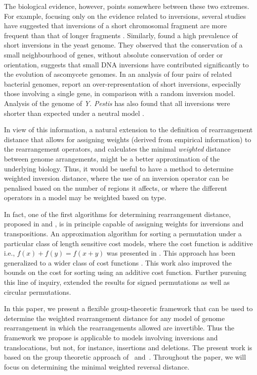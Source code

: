 \documentclass[utf8]{Frontiers_LaTex_Templates/frontiersFPHY} %
\numberwithin{equation}{section}
\begin{document}
The biological evidence, however, points somewhere between these two extremes. For example, focusing only on the evidence related to inversions, several studies have suggested that inversions of a short chromosomal fragment are more frequent than that of longer fragments \citep{seoighe2000prevalence, lefebvre2003detection,Darling2008,eisen2000evidence}. Similarly, \citet{seoighe2000prevalence} found a high prevalence of short inversions in the yeast genome. They observed that the conservation of a small neighbourhood of genes, without absolute conservation of order or orientation, suggests that small DNA inversions have contributed significantly to the evolution of ascomycete genomes. In an analysis of four pairs of related bacterial genomes, \citet{lefebvre2003detection} report an over-representation of short inversions, especially those involving a single gene, in comparison with a random inversion model. Analysis of the genome of \emph{Y. Pestis} has also found that all inversions were shorter than expected under a neutral model \citep{Darling2008}.

In view of this information, a natural extension to the definition of rearrangement distance 
that allows for assigning weights (derived from empirical information) to the rearrangement operators, and calculates the minimal \emph{weighted} distance between genome arrangements, might be a better approximation of the underlying biology. 
Thus, it would be useful to have a method to determine weighted inversion distance, where the use of an inversion operator can be penalised based on the number of regions it affects, or where the different operators in a model may be weighted based on type. 

In fact, one of the first algorithms for determining rearrangement distance, proposed in \citet{sankoff1992edit} and \citet{sankoff1992gene}, is in principle capable of assigning weights for inversions and transpositions. An approximation algorithm for sorting a permutation under a particular class of length sensitive cost models, where the cost function is additive i.e., $f(x) + f(y) = f(x+y)$ was presented in \citet{pinter2002genomic}. This approach has been generalized  to a wider class of cost functions \citep{bender2008improved}. This work also improved the bounds on the cost for sorting using an additive cost function. Further pursuing this line of inquiry, \citet{swidan2004sorting} extended the results for signed permutations as well as circular permutations.


In this paper, we present a flexible group-theoretic framework that can be used to determine the weighted rearrangement distance for any model of genome rearrangement in which the rearrangements allowed are invertible.  Thus the framework we propose is applicable to models involving inversions and translocations, but not, for instance, insertions and deletions.  The present work is based on the group theoretic approach of~\citet{egrinagy2013group} and~\citet{francis2014algebraic}. Throughout the paper, we will focus on determining the minimal weighted reversal distance.
\end{document}
